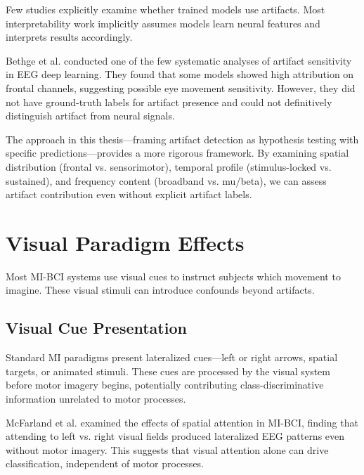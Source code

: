 Few studies explicitly examine whether trained models use artifacts. Most interpretability work implicitly assumes models learn neural features and interprets results accordingly.

Bethge et al. \cite{bethge2022eeg} conducted one of the few systematic analyses of artifact sensitivity in EEG deep learning. They found that some models showed high attribution on frontal channels, suggesting possible eye movement sensitivity. However, they did not have ground-truth labels for artifact presence and could not definitively distinguish artifact from neural signals.

The approach in this thesis—framing artifact detection as hypothesis testing with specific predictions—provides a more rigorous framework. By examining spatial distribution (frontal vs. sensorimotor), temporal profile (stimulus-locked vs. sustained), and frequency content (broadband vs. mu/beta), we can assess artifact contribution even without explicit artifact labels.


\section{Visual Paradigm Effects}
\label{sec:rw_visual}

Most MI-BCI systems use visual cues to instruct subjects which movement to imagine. These visual stimuli can introduce confounds beyond artifacts.


\subsection{Visual Cue Presentation}
\label{subsec:rw_visual_cues}

Standard MI paradigms present lateralized cues—left or right arrows, spatial targets, or animated stimuli. These cues are processed by the visual system before motor imagery begins, potentially contributing class-discriminative information unrelated to motor processes.

McFarland et al. \cite{mcfarland2000spatial} examined the effects of spatial attention in MI-BCI, finding that attending to left vs. right visual fields produced lateralized EEG patterns even without motor imagery. This suggests that visual attention alone can drive classification, independent of motor processes.

